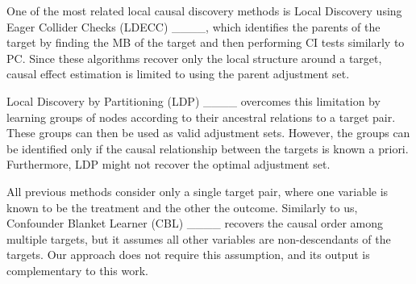 One of the most related local causal discovery methods is Local Discovery using Eager Collider Checks (LDECC) ____, which identifies the parents of the target by finding the MB of the target and then performing \ac{CI} tests similarly to PC.
Since these algorithms recover only the local structure around a target, causal effect estimation is limited to using the parent adjustment set.

Local Discovery by Partitioning (LDP) ____ overcomes this limitation by learning groups of nodes according to their ancestral relations to a target pair.
These groups can then be used as valid adjustment sets.
However, the groups can be identified only if the causal relationship between the targets is known a priori.
Furthermore, LDP might not recover the optimal adjustment set.

All previous methods consider only a single target pair, where one variable is known to be the treatment and the other the outcome.
Similarly to us, Confounder Blanket Learner (CBL) ____ recovers the causal order among multiple targets, but it assumes all other variables are non-descendants of the targets. Our approach does not require this assumption, and its output is complementary to this work.
